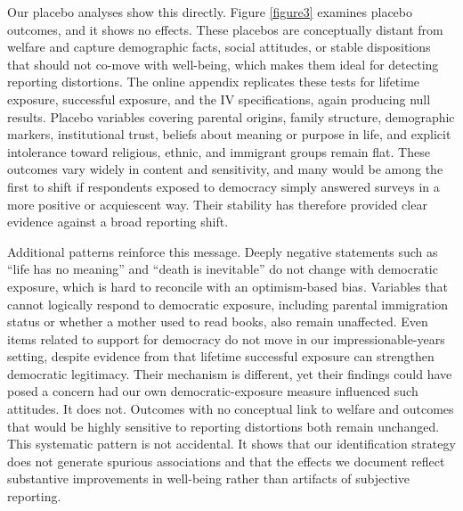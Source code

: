 \documentclass[11pt]{article}
\newcommand{\bbb}[1]{\cTwo{#1}} %
\begin{document}
Our placebo analyses show this directly. Figure \ref{figure3} examines placebo outcomes, and it shows no effects. These placebos are conceptually distant from welfare and capture demographic facts, social attitudes, or stable dispositions that should not co-move with well-being, which makes them ideal for detecting reporting distortions. The online appendix replicates these tests for lifetime exposure, successful exposure, and the IV specifications, again producing null results. Placebo variables covering parental origins, family structure, demographic markers, institutional trust, beliefs about meaning or purpose in life, and explicit intolerance toward religious, ethnic, and immigrant groups remain flat. These outcomes vary widely in content and sensitivity, and many would be among the first to shift if respondents exposed to democracy simply answered surveys in a more positive or acquiescent way. Their stability has therefore provided clear evidence against a broad reporting shift.

Additional patterns reinforce this message. Deeply negative statements such as “life has no meaning” and “death is inevitable” do not change with democratic exposure, which is hard to reconcile with an optimism-based bias. Variables that cannot logically respond to democratic exposure, including parental immigration status or whether a mother used to read books, also remain unaffected. Even items related to support for democracy do not move in our impressionable-years setting, despite evidence from \bbb{Acemoglu2023} that lifetime successful exposure can strengthen democratic legitimacy. Their mechanism is different, yet their findings could have posed a concern had our own democratic-exposure measure influenced such attitudes. It does not. Outcomes with no conceptual link to welfare and outcomes that would be highly sensitive to reporting distortions both remain unchanged. This systematic pattern is not accidental. It shows that our identification strategy does not generate spurious associations and that the effects we document reflect substantive improvements in well-being rather than artifacts of subjective reporting.
\end{document}
